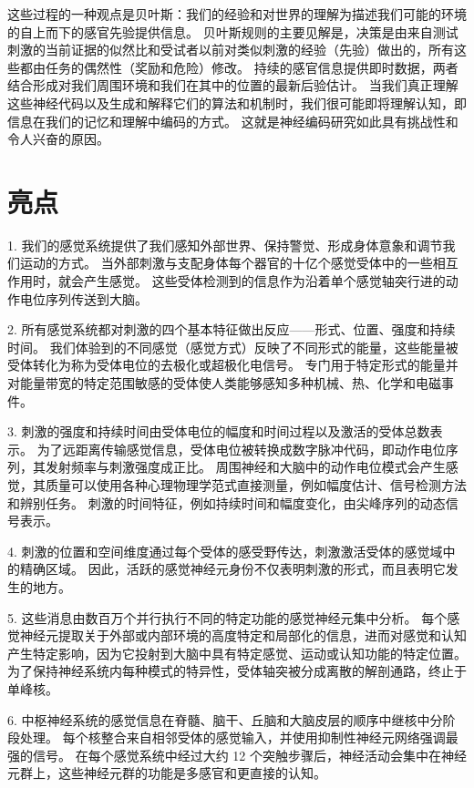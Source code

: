 这些过程的一种观点是贝叶斯：我们的经验和对世界的理解为描述我们可能的环境的自上而下的感官先验提供信息。 
贝叶斯规则的主要见解是，决策是由来自测试刺激的当前证据的似然比和受试者以前对类似刺激的经验（先验）做出的，所有这些都由任务的偶然性（奖励和危险）修改。 
持续的感官信息提供即时数据，两者结合形成对我们周围环境和我们在其中的位置的最新后验估计。 
当我们真正理解这些神经代码以及生成和解释它们的算法和机制时，我们很可能即将理解认知，即信息在我们的记忆和理解中编码的方式。 
这就是神经编码研究如此具有挑战性和令人兴奋的原因。



\section{亮点}

1. 我们的感觉系统提供了我们感知外部世界、保持警觉、形成身体意象和调节我们运动的方式。 当外部刺激与支配身体每个器官的十亿个感觉受体中的一些相互作用时，就会产生感觉。 
这些受体检测到的信息作为沿着单个感觉轴突行进的动作电位序列传送到大脑。 

2. 所有感觉系统都对刺激的四个基本特征做出反应——形式、位置、强度和持续时间。 
我们体验到的不同感觉（感觉方式）反映了不同形式的能量，这些能量被受体转化为称为受体电位的去极化或超极化电信号。 
专门用于特定形式的能量并对能量带宽的特定范围敏感的受体使人类能够感知多种机械、热、化学和电磁事件。 


3. 刺激的强度和持续时间由受体电位的幅度和时间过程以及激活的受体总数表示。 
为了远距离传输感觉信息，受体电位被转换成数字脉冲代码，即动作电位序列，其发射频率与刺激强度成正比。 
周围神经和大脑中的动作电位模式会产生感觉，其质量可以使用各种心理物理学范式直接测量，例如幅度估计、信号检测方法和辨别任务。 
刺激的时间特征，例如持续时间和幅度变化，由尖峰序列的动态信号表示。 

4. 刺激的位置和空间维度通过每个受体的感受野传达，刺激激活受体的感觉域中的精确区域。 
因此，活跃的感觉神经元身份不仅表明刺激的形式，而且表明它发生的地方。 


5. 这些消息由数百万个并行执行不同的特定功能的感觉神经元集中分析。 
每个感觉神经元提取关于外部或内部环境的高度特定和局部化的信息，进而对感觉和认知产生特定影响，因为它投射到大脑中具有特定感觉、运动或认知功能的特定位置。 
为了保持神经系统内每种模式的特异性，受体轴突被分成离散的解剖通路，终止于单峰核。 


6. 中枢神经系统的感觉信息在脊髓、脑干、丘脑和大脑皮层的顺序中继核中分阶段处理。 
每个核整合来自相邻受体的感觉输入，并使用抑制性神经元网络强调最强的信号。 
在每个感觉系统中经过大约 12 个突触步骤后，神经活动会集中在神经元群上，这些神经元群的功能是多感官和更直接的认知。 


